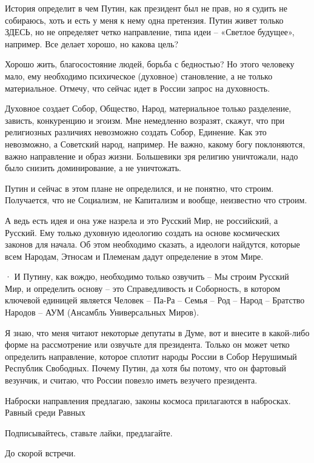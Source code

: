 История определит в чем Путин, как президент был не прав, но я судить не
собираюсь, хоть и есть у меня к нему одна претензия. Путин живет только ЗДЕСЬ,
но не определяет четко направление, типа идеи – «Светлое будущее», например.
Все делает хорошо, но какова цель?

Хорошо жить, благосостояние людей, борьба с бедностью? Но этого человеку мало,
ему необходимо психическое (духовное) становление, а не только материальное.
Отмечу, что сейчас идет в России запрос на духовность.

Духовное создает Собор, Общество, Народ, материальное только разделение,
зависть, конкуренцию и эгоизм. Мне немедленно возразят, скажут, что при
религиозных различиях невозможно создать Собор, Единение. Как это невозможно, а
Советский народ, например. Не важно, какому богу поклоняются, важно направление
и образ жизни. Большевики зря религию уничтожали, надо было снизить
доминирование, а не уничтожать.

Путин и сейчас в этом плане не определился, и не понятно, что строим.
Получается, что не Социализм, не Капитализм и вообще, неизвестно что строим.

А ведь есть идея и она уже назрела и это Русский Мир, не российский, а Русский.
Ему только духовную идеологию создать на основе космических законов для начала.
Об этом необходимо сказать, а идеологи найдутся, которые всем Народам, Этносам
и Племенам дадут определение в этом Мире.

· И Путину, как вождю, необходимо только озвучить – Мы строим Русский Мир, и
определить основу – это Справедливость и Соборность, в котором ключевой
единицей является Человек – Па-Ра – Семья – Род – Народ – Братство Народов –
АУМ (Ансамбль Универсальных Миров).

Я знаю, что меня читают некоторые депутаты в Думе, вот и внесите в какой-либо
форме на рассмотрение или озвучьте для президента. Только он может четко
определить направление, которое сплотит народы России в Собор Нерушимый
Республик Свободных. Почему Путин, да хотя бы потому, что он фартовый везунчик,
и считаю, что России повезло иметь везучего президента.

Наброски направления предлагаю, законы космоса прилагаются в набросках. Равный
среди Равных

Подписывайтесь, ставьте лайки, предлагайте.

До скорой встречи.
